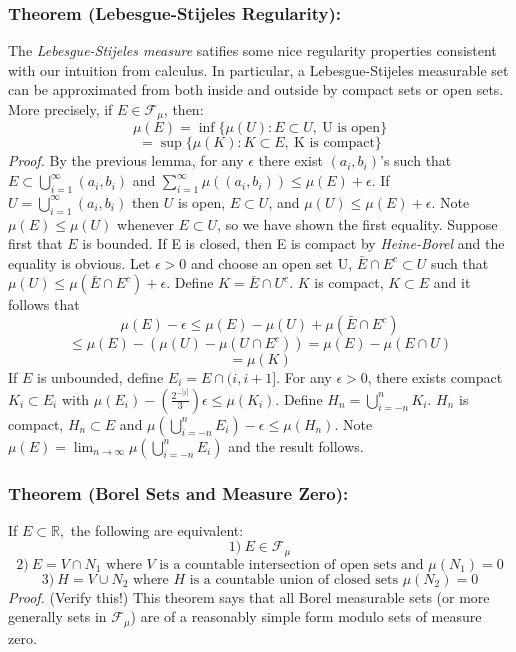 \documentclass{article}
\begin{document}
\subsubsection{Theorem (Lebesgue-Stijeles Regularity):}
The \emph{Lebesgue-Stijeles measure} satifies some nice regularity properties consistent with our intuition from calculus. In particular, a Lebesgue-Stijeles measurable set can be approximated from both inside and outside by compact sets or open sets.  \newline \newline
More precisely, if $E  \in \mathcal{F}_\mu$, then:
\[
\mu(E)=\inf\{\mu(U) : E\subset U, \ \text{U is open}\}
\]
\[
=\sup\{\mu(K) : K\subset E, \ \text{K is compact}\}
\]
\textit{Proof.} \newline \newline
By the previous lemma, for any $\epsilon$ there exist $(a_i,b_i)$'s such that $E\subset\bigcup_{i=1}^{\infty}(a_i,b_i)$ and $\sum_{i=1}^{\infty}\mu((a_i,b_i))\leq \mu(E)+\epsilon$. If $U=\bigcup_{i=1}^{\infty}(a_i,b_i)$ then $U$ is open, $E\subset U$, and $\mu(U)\leq\mu(E)+\epsilon$. Note $\mu(E) \leq\mu(U) $ whenever $E \subset U$, so we have shown the first equality. \newline \newline
Suppose first that $E$ is bounded. If E is closed, then E is compact by \emph{Heine-Borel} and the equality is obvious. Let $\epsilon>0$ and choose an open set U, $\bar{E}\cap E^c\subset U$ such that $\mu(U)\leq\mu(\bar{E}\cap E^c)+\epsilon$. Define $K=\bar{E}\cap U^c$. $K$ is compact, $K\subset E$ and it follows that 
\[
\mu(E)-\epsilon\leq\mu(E)-\mu(U)+\mu(\bar{E}\cap E^c)
\]
\[
\leq\mu(E)-(\mu(U)-\mu(U\cap E^c))=\mu(E) -\mu(E\cap U)
\]
\[
=\mu(K)
\]
If $E$ is unbounded, define $E_i=E\cap(i,i+1]$. For any $\epsilon>0$, there exists compact $K_i\subset E_i$ with $\mu(E_i)-(\frac{2^{-|i|}}{3})\epsilon\leq\mu(K_i)$. Define $H_n=\bigcup_{i=-n}^n{K_i}$. $H_n$ is compact, $H_n\subset E$ and $\mu(\bigcup_{i=-n}^n{E_i})-\epsilon\leq\mu(H_n)$. Note $\mu(E)=\lim_{n\to\infty}\mu(\bigcup_{i=-n}^n{E_i})$ and the result follows. 

\subsubsection{Theorem (Borel Sets and Measure Zero):}
If $E \subset\mathbb{R}, $ the following are equivalent:
\[
1) \ E \in \mathcal{F}_\mu
\]
\[
2) \ E = V\cap N_1 \text{ where } V \text{ is a countable intersection of open sets and } \mu(N_1)=0
\]
\[
3) \ H = V\cup N_2 \text{ where } H \text{ is a countable union of closed sets } \mu(N_2)=0
\]
\textit{Proof.}\newline \newline 
(Verify this!)
\newline \newline 
This theorem says that all Borel measurable sets (or more generally sets in $\mathcal{F}_\mu$) are of a reasonably simple form modulo sets of measure zero.
\end{document}
